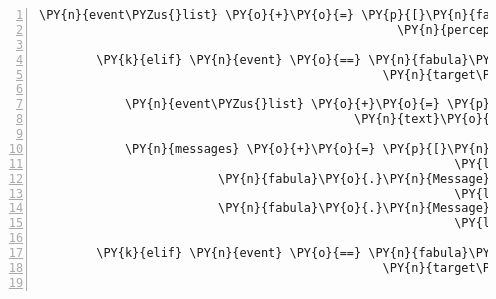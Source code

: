 \begin{Verbatim}[commandchars=\\\{\},numbers=left,firstnumber=1,stepnumber=1]
            \PY{n}{event\PYZus{}list} \PY{o}{+}\PY{o}{=} \PY{p}{[}\PY{n}{fabula}\PY{o}{.}\PY{n}{PerceptionEvent}\PY{p}{(}\PY{n}{identifier}\PY{o}{=}\PY{n}{ID\PYZus{}CASSANDRA}\PY{p}{,}
                                                  \PY{n}{perception}\PY{o}{=}\PY{l+s}{\PYZsq{}}\PY{l+s}{Dieser Weg ist nur für sehr kleine Wesen gemacht.}\PY{l+s}{\PYZsq{}}\PY{p}{)}\PY{p}{]}

        \PY{k}{elif} \PY{n}{event} \PY{o}{==} \PY{n}{fabula}\PY{o}{.}\PY{n}{TriesToTalkToEvent}\PY{p}{(}\PY{n}{identifier}\PY{o}{=}\PY{n}{ID\PYZus{}KUNI}\PY{p}{,}
                                                \PY{n}{target\PYZus{}identifier}\PY{o}{=}\PY{l+s}{\PYZsq{}}\PY{l+s}{guardian}\PY{l+s}{\PYZsq{}}\PY{p}{)}\PY{p}{:}

            \PY{n}{event\PYZus{}list} \PY{o}{+}\PY{o}{=} \PY{p}{[}\PY{n}{fabula}\PY{o}{.}\PY{n}{SaysEvent}\PY{p}{(}\PY{n}{identifier}\PY{o}{=}\PY{n}{ID\PYZus{}KUNI}\PY{p}{,}
                                            \PY{n}{text}\PY{o}{=}\PY{l+s}{\PYZsq{}}\PY{l+s}{Hey. Kannst du mich mal durch lassen?}\PY{l+s}{\PYZsq{}}\PY{p}{)}\PY{p}{]}

            \PY{n}{messages} \PY{o}{+}\PY{o}{=} \PY{p}{[}\PY{n}{fabula}\PY{o}{.}\PY{n}{Message}\PY{p}{(}\PY{p}{[}\PY{n}{fabula}\PY{o}{.}\PY{n}{SaysEvent}\PY{p}{(}\PY{l+s}{\PYZsq{}}\PY{l+s}{guardian}\PY{l+s}{\PYZsq{}}\PY{p}{,}
                                                          \PY{l+s}{\PYZsq{}}\PY{l+s}{Wenn du 5 Goldtaler locker machen kannst.}\PY{l+s}{\PYZsq{}}\PY{p}{)}\PY{p}{]}\PY{p}{)}\PY{p}{,}
                         \PY{n}{fabula}\PY{o}{.}\PY{n}{Message}\PY{p}{(}\PY{p}{[}\PY{n}{fabula}\PY{o}{.}\PY{n}{SaysEvent}\PY{p}{(}\PY{n}{ID\PYZus{}KUNI}\PY{p}{,}
                                                          \PY{l+s}{\PYZsq{}}\PY{l+s}{5 Taler? Das sind ja Preise!}\PY{l+s}{\PYZsq{}}\PY{p}{)}\PY{p}{]}\PY{p}{)}\PY{p}{,}
                         \PY{n}{fabula}\PY{o}{.}\PY{n}{Message}\PY{p}{(}\PY{p}{[}\PY{n}{fabula}\PY{o}{.}\PY{n}{SaysEvent}\PY{p}{(}\PY{l+s}{\PYZsq{}}\PY{l+s}{guardian}\PY{l+s}{\PYZsq{}}\PY{p}{,}
                                                          \PY{l+s}{\PYZsq{}}\PY{l+s}{Wenn du nicht zahlen kannst, kommst du auch nicht durch.}\PY{l+s}{\PYZsq{}}\PY{p}{)}\PY{p}{]}\PY{p}{)}\PY{p}{]}

        \PY{k}{elif} \PY{n}{event} \PY{o}{==} \PY{n}{fabula}\PY{o}{.}\PY{n}{TriesToTalkToEvent}\PY{p}{(}\PY{n}{identifier}\PY{o}{=}\PY{n}{ID\PYZus{}CASSANDRA}\PY{p}{,}
                                                \PY{n}{target\PYZus{}identifier}\PY{o}{=}\PY{l+s}{\PYZsq{}}\PY{l+s}{guardian}\PY{l+s}{\PYZsq{}}\PY{p}{)}\PY{p}{:}


\end{Verbatim}
